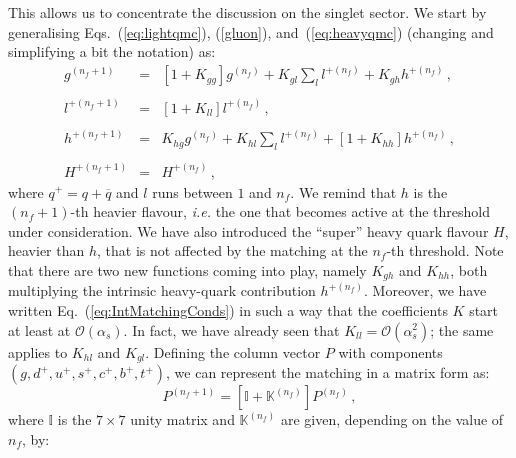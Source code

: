\documentclass[10pt,a4paper]{article}
\begin{document}
This allows us to concentrate the discussion on the singlet sector. We
start by generalising Eqs.~(\ref{eq:lightqmc}), (\ref{gluon}),
and~(\ref{eq:heavyqmc}) (changing and simplifying a bit the notation)
as:
\begin{equation}
\begin{array}{rcl}
  \displaystyle g^{(n_f+1)}&=&\displaystyle
                               [1+K_{gg}]g^{(n_f)}+K_{gl}\sum_l
                               l^{+(n_f)} + K_{gh}h^{+(n_f)}\,,\\
  \\
  \displaystyle l^{+(n_f+1)}&=&\displaystyle [1+K_{ll}]l^{+(n_f)}\,,\\
  \\
  \displaystyle h^{+(n_f+1)}&=&\displaystyle K_{hg}g^{(n_f)} + K_{hl}\sum_l
                                l^{+(n_f)}+[1+K_{hh}]h^{+(n_f)}\,,\\
  \\
  H^{+(n_f+1)} &=& H^{+(n_f)}\,,
\end{array}
\label{eq:IntMatchingConds}
\end{equation}
where $q^+=q+\overline{q}$ and $l$ runs between $1$ and $n_f$. We
remind that $h$ is the $(n_f+1)$-th heavier flavour, \textit{i.e.}
the one that becomes active at the threshold under consideration. We
have also introduced the ``super'' heavy quark flavour $H$, heavier
than $h$, that is not affected by the matching at the $n_f$-th
threshold. Note that there are two new functions coming into play,
namely $K_{gh}$ and $K_{hh}$, both multiplying the intrinsic
heavy-quark contribution $h^{+(n_f)}$. Moreover, we have written
Eq.~(\ref{eq:IntMatchingConds}) in such a way that the coefficients
$K$ start at least at $\mathcal{O}(\alpha_s)$. In fact, we have
already seen that $K_{ll}=\mathcal{O}(\alpha_s^2)$; the same applies
to $K_{hl}$ and $K_{gl}$. Defining the column vector $P$ with
components $(g,d^+,u^+,s^+,c^+,b^+,t^+)$, we can represent the
matching in a matrix form as:
\begin{equation}
P^{(n_f+1)} = \left[\mathbb{I}+\mathbb{K}^{(n_f)}\right]P^{(n_f)}\,,
\end{equation}
where $\mathbb{I}$ is the $7\times7$ unity matrix and
$\mathbb{K}^{(n_f)}$ are given, depending on the value of $n_f$, by:
\end{document}
